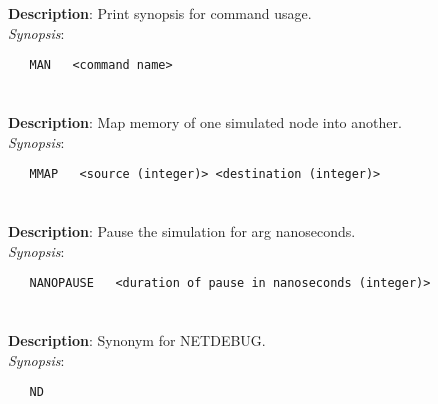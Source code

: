\section{\quad{}}
\label{manpages:MAN}
\label{manpages:man}
\vspace{-0.1in}
{\bf Description}: 	Print synopsis for command usage.\\[1.5ex]
{\em Synopsis}:
\vspace{-0.05in}
\scriptsize
\begin{lstlisting}
   MAN   <command name>								
\end{lstlisting}
\normalsize
\vspace{-0.05in}


\section{\quad{}}
\label{manpages:MMAP}
\label{manpages:mmap}
\vspace{-0.1in}
{\bf Description}: 	Map memory of one simulated node into another.\\[1.5ex]
{\em Synopsis}:
\vspace{-0.05in}
\scriptsize
\begin{lstlisting}
   MMAP   <source (integer)> <destination (integer)>			
\end{lstlisting}
\normalsize
\vspace{-0.05in}


\section{\quad{}}
\label{manpages:NANOPAUSE}
\label{manpages:nanopause}
\vspace{-0.1in}
{\bf Description}: 	Pause the simulation for arg nanoseconds.\\[1.5ex]
{\em Synopsis}:
\vspace{-0.05in}
\scriptsize
\begin{lstlisting}
   NANOPAUSE   <duration of pause in nanoseconds (integer)>				
\end{lstlisting}
\normalsize
\vspace{-0.05in}


\section{\quad{}}
\label{manpages:ND}
\label{manpages:nd}
\vspace{-0.1in}
{\bf Description}: 	Synonym for NETDEBUG.\\[1.5ex]
{\em Synopsis}:
\vspace{-0.05in}
\scriptsize
\begin{lstlisting}
   ND   											
\end{lstlisting}
\normalsize
\vspace{-0.05in}


